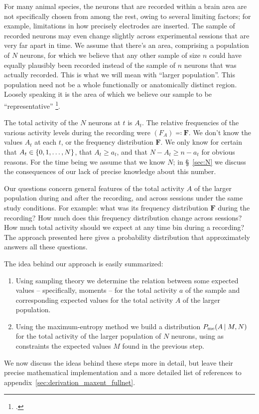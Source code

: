 \documentclass[\ifafour a4paper,12pt,\else a5paper,10pt,\fi%
onecolumn,oneside,article,%
british%
]{memoir}
\theoremstyle{remark}
\theoremstyle{innote}
\newcommand*{\citep}{\footcites}
\newcommand*{\defs}{\eqqcolon}
\renewcommand*{\ge}{\geqslant}%
\DeclarePairedDelimiter\set{\{}{\}}
\renewcommand*{\|}{\nonscript\,\vert\nonscript\;\mathopen{}}
\newcommand*{\sect}{\S}%
\newcommand*{\yAv}{A}
\newcommand*{\yav}{a}
\newcommand*{\yFF}{F}
\newcommand*{\yF}{\bm{\yFF}}
\newcommand*{\ya}{\yav}%
\newcommand*{\yA}{\yAv}%
\newcommand*{\px}{P_{\text{me}}}
\begin{document}
For many animal species, the neurons that are recorded within a brain area
are not specifically chosen from among the rest, owing to several limiting
factors; for example, limitations in how precisely electrodes are inserted.
The sample of recorded neurons may even change slightly across experimental
sessions that are very far apart in time. We assume that there's an area,
comprising a population of $N$ neurons, for which we believe that any other
sample of size $n$ could have equally plausibly been recorded instead of
the sample of $n$ neurons that was actually recorded. This is what we will
mean with \enquote{larger population}. This population need not be a whole
functionally or anatomically distinct region. Loosely speaking it is the
area of which we believe our sample to be \enquote{representative}
\citep[with the warnings that accompany that
term:][]{kruskaletal1979b,kruskaletal1979c}.

The total activity of the $N$ neurons at $t$ is $\yA_{t}$. The relative
frequencies of the various activity levels during the recording were
$(\yFF_{\yA}) \defs \yF$. We don't know the values $\yA_{t}$ at each $t$,
or the frequency distribution $\yF$. We only know for certain that
$\yA_{t} \in \set{0, 1, \dotsc, N}$, that $\yA_{t} \ge \ya_{t}$, and that
$N-\yA_{t} \ge n-\ya_{t}$ for obvious reasons. For the time being we assume
that we know $N$; in \sect~\ref{sec:N} we discuss the consequences of our
lack of precise knowledge about this number.

Our questions concern general features of the total activity $\yA$ of the
larger population during and after the recording, and across sessions under
the same study conditions. For example: what was its frequency distribution
$\yF$ during the recording? How much does this frequency distribution
change across sessions? How much total activity should we expect at any
time bin during a recording? The approach presented here gives a
probability distribution that approximately answers all these questions.


\bigskip

The idea behind our approach is easily summarized:
\begin{enumerate}[label=(\alph*)]
\item\label{item:sample_step} Using sampling theory we determine the
  relation between some expected values -- specifically, moments -- for the
  total activity $\ya$ of the sample and corresponding expected values %
  for the total activity $\yA$ of the larger population.
\item\label{item:maxent_step} Using the maximum-entropy method we build a
  distribution $\px(\yA \| M, N)$ for the total activity of the larger
  population of $N$ neurons, using as constraints the expected values $M$
  found in the previous step.
\end{enumerate}
We now discuss the ideas behind these steps more in detail, but leave their
precise mathematical implementation and a more detailed list of references
to appendix~\ref{sec:derivation_maxent_fullnet}.
\end{document}
